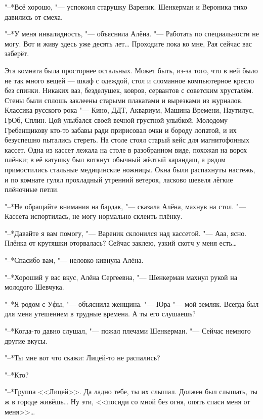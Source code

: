 "--*Всё хорошо, "--- успокоил старушку Вареник.
Шенкерман и Вероника тихо давились от смеха.

\asterism

\textspace

"--*У меня инвалидность, "--- объяснила Алёна.
"--- Работать по специальности не могу.
Вот и живу здесь уже десять лет\ldots{}
Проходите пока ко мне, Рая сейчас вас заберёт.

Эта комната была просторнее остальных.
Может быть, из-за того, что в ней было не так много вещей --- шкаф с одеждой, стол и сломанное компьютерное кресло без спинки.
Никаких ваз, безделушек, ковров, сервантов с советским хрусталём.
Стены были сплошь заклеены старыми плакатами и вырезками из журналов.
Классика русского рока "--- Кино, ДДТ, Аквариум, Машина Времени, Наутилус, ГрОб, Сплин.
Цой улыбался своей вечной грустной улыбкой.
Молодому Гребенщикову кто-то забавы ради пририсовал очки и бороду лопатой, и их безуспешно пытались стереть.
На столе стоял старый кейс для магнитофонных кассет.
Одна из кассет лежала на столе в разобранном виде, похожая на ворох плёнки;
в её катушку был воткнут обычный жёлтый карандаш, а рядом примостились стальные медицинские ножницы.
Окна были распахнуты настежь, и по комнате гулял прохладный утренний ветерок, ласково шевеля лёгкие плёночные петли.

"--*Не обращайте внимания на бардак, "--- сказала Алёна, махнув на стол.
"--- Кассета испортилась, не могу нормально склеить плёнку.

"--*Давайте я вам помогу, "--- Вареник склонился над кассетой.
"--- Ааа, ясно.
Плёнка от крутяшки оторвалась?
Сейчас заклею, узкий скотч у меня есть\ldots{}

"--*Спасибо вам, "--- неловко кивнула Алёна.

"--*Хороший у вас вкус, Алёна Сергеевна, "--- Шенкерман махнул рукой на молодого Шевчука.

"--*Я родом с Уфы, "--- объяснила женщина.
"--- Юра "--- мой земляк.
Всегда был для меня утешением в трудные времена.
А ты его слушаешь?

"--*Когда-то давно слушал, "--- пожал плечами Шенкерман.
"--- Сейчас немного другие вкусы.

"--*Ты мне вот что скажи: Лицей-то не распались?

"--*Кто?

"--*Группа <<Лицей>>.
Да ладно тебе, ты их слышал.
Должен был слышать, ты ж в городе живёшь\ldots{}
Ну эти, <<посиди со мной без огня, опять спаси меня от меня>>\ldots{}

